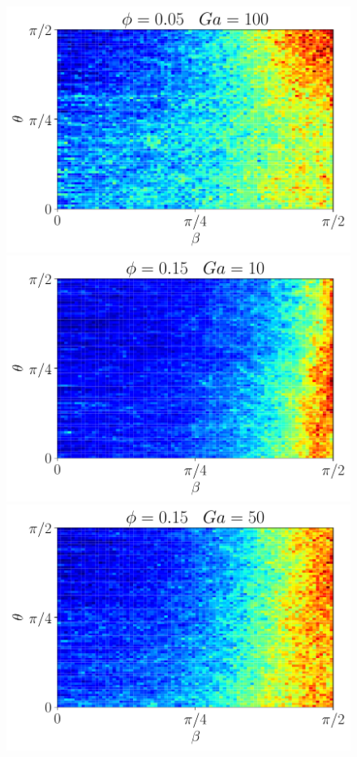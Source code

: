 \begin{figure}[h!]
    \includegraphics[height =\size]{image/N_10/beta/2DMAP_beta_theta_dmin_10_Bo0_5PHI0_05mu_r0_042Ga100.pdf}
    \includegraphics[height =\size]{image/N_10/beta/2DMAP_beta_theta_dmin_10_Bo0_5PHI0_15mu_r0_042Ga10.pdf}
    \includegraphics[height =\size]{image/N_10/beta/2DMAP_beta_theta_dmin_10_Bo0_5PHI0_15mu_r0_042Ga50.pdf}

\end{figure}
